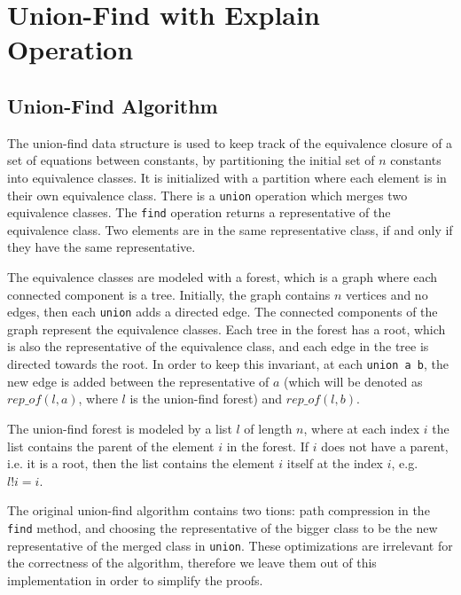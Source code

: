 
\chapter{Union-Find with Explain Operation}\label{chapter:union_find}

\section{Union-Find Algorithm}
\label{section:uf-algorithm}

The union-find data structure is used to keep track of the equivalence closure of a set of equations between constants,  by partitioning the initial set of $n$ constants into equivalence classes. It is initialized with a partition where each element is in their own equivalence class. There is a \lstinline{union} operation which merges two equivalence classes. The \lstinline{find} operation returns a representative of the equivalence class. Two elements are in the same representative class, if and only if they have the same representative.

The equivalence classes are modeled with a forest, which is a graph where each connected component is a tree. Initially, the graph contains $n$ vertices and no edges, then each \lstinline{union} adds a directed edge. The connected components of the graph represent the equivalence classes. Each tree in the forest has a root, which is also the representative of the equivalence class, and each edge in the tree is directed towards the root. In order to keep this invariant, at each \lstinline{union a b}, the new edge is added between the representative of $a$ (which will be denoted as $rep\_of(l, a)$, where $l$ is the union-find forest) and $rep\_of(l, b)$.

The union-find forest is modeled by a list $l$ of length $n$, where at each index $i$ the list contains the parent of the element $i$ in the forest. If $i$ does not have a parent, i.e. it is a root, then the list contains the element $i$ itself at the index $i$, e.g. $l!i = i$.

The original union-find algorithm \cite{Tarjan} contains two tions: path compression in the \lstinline{find} method, and choosing the representative of the bigger class to be the new representative of the merged class in \lstinline{union}. These optimizations are irrelevant for the correctness of the algorithm, therefore we leave them out of this implementation in order to simplify the proofs.


